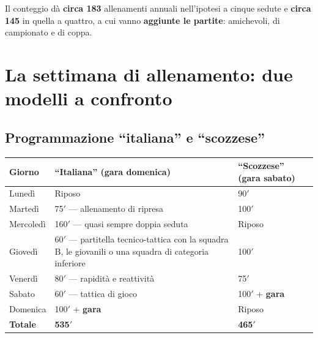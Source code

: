 Il conteggio dà \textbf{circa 183} allenamenti annuali nell'ipotesi a cinque sedute e
\textbf{circa 145} in quella a quattro, a cui vanno \textbf{aggiunte le partite}: amichevoli, di
campionato e di coppa.

\section{La settimana di allenamento: due modelli a confronto}

\subsection{Programmazione ``italiana'' e ``scozzese''}

\begin{table}[htbp]
  \centering
  \small
  \renewcommand{\arraystretch}{1.3}
  \begin{tabularx}{\textwidth}{|l|X|X|}
    \hline
    \textbf{Giorno} & \textbf{``Italiana'' (gara domenica)} & \textbf{``Scozzese'' (gara sabato)} \\
    \hline
    Lunedì & Riposo & 90$'$ \\
    \hline
    Martedì & 75$'$ --- allenamento di ripresa & 100$'$ \\
    \hline
    Mercoledì & 160$'$ --- quasi sempre doppia seduta & Riposo \\
    \hline
    Giovedì & 60$'$ --- partitella tecnico-tattica con la squadra B, le giovanili o una squadra di
      categoria inferiore & 100$'$ \\
    \hline
    Venerdì & 80$'$ --- rapidità e reattività & 75$'$ \\
    \hline
    Sabato & 60$'$ --- tattica di gioco & 100$'$ + \textbf{gara} \\
    \hline
    Domenica & 100$'$ + \textbf{gara} & Riposo \\
    \hline
    \textbf{Totale} & \textbf{535$'$} & \textbf{465$'$} \\
    \hline
  \end{tabularx}
\end{table}

